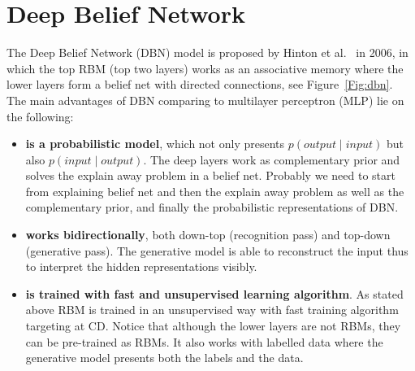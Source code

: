 \section{Deep Belief Network}
The Deep Belief Network (DBN) model is proposed by Hinton et al.~\cite{hinton2006fast} in 2006, in which the top RBM (top two layers) works as an associative memory where the lower layers form a belief net with directed connections, see Figure~\ref{Fig:dbn}. %
The main advantages of DBN comparing to multilayer perceptron (MLP) lie on the following:
	\begin{itemize}
	  \item \textbf{is a probabilistic model}, which not only presents $p(output \mid input)$ but also $p(input \mid output)$.
	  The deep layers work as complementary prior and solves the explain away problem in a belief net.
		Probably we need to start from explaining belief net and then the explain away problem as well as the complementary prior, and finally the probabilistic representations of DBN. 
	  \item \textbf{works bidirectionally}, both down-top (recognition pass) and top-down (generative pass).
	  The generative model is able to reconstruct the input thus to interpret the hidden representations visibly.
	  \item \textbf{is trained with fast and unsupervised learning algorithm}.
	  As stated above RBM is trained in an unsupervised way with fast training algorithm targeting at CD.
	  Notice that although the lower layers are not RBMs, they can be pre-trained as RBMs.
	  It also works with labelled data where the generative model presents both the labels and the data. 
	\end{itemize}
